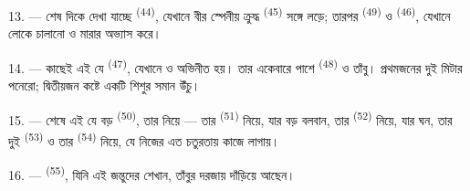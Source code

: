13. --- শেষ দিকে দেখা যাচ্ছে  \textsuperscript{(44)},
যেখানে বীর স্পেনীয়  ক্রুদ্ধ 
\textsuperscript{(45)} সঙ্গে লড়ে; তারপর  \textsuperscript{(49)}
ও  \textsuperscript{(46)}, যেখানে লোকে 
চালানো ও  মারার অভ্যাস করে।

14. --- কাছেই এই যে  \textsuperscript{(47)}, যেখানে
 ও  অভিনীত হয়। তার একেবারে পাশে
 \textsuperscript{(48)} ও  তাঁবু। প্রথমজনের
 দুই মিটার পনেরো; দ্বিতীয়জন কষ্টে একটি শিশুর সমান উঁচু।

15. --- শেষে এই যে বড়  \textsuperscript{(50)}, তার
 নিয়ে --- তার  \textsuperscript{(51)}
নিয়ে, যার  বড় বলবান, তার  \textsuperscript{(52)}
নিয়ে, যার  ঘন, তার দুই  \textsuperscript{(53)} ও
তার  \textsuperscript{(54)} নিয়ে, যে নিজের 
এত চতুরতায় কাজে লাগায়।

16. ---  \textsuperscript{(55)}, যিনি এই জন্তুদের শেখান,
তাঁবুর দরজায় দাঁড়িয়ে আছেন।
\VUsaut{6.0mm}
\VUfilet{22mm}
